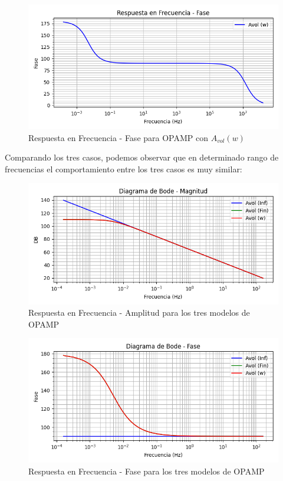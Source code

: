 \begin{figure}[H]
    \centering 
    \includegraphics [scale=1] {../Ejercicio3-CircuitoIntegradoresyDerivadores/Imagenes/teorico-avol-w-integrador-fase.png} 
    \caption{Respuesta en Frecuencia - Fase para OPAMP con $A_{vol}(w)$ }
    \label{fig:emptyPlotTool}
\end{figure}

Comparando los tres casos, podemos observar que en determinado rango de frecuencias el comportamiento entre los tres casos es muy similar:


\begin{figure}[H]
    \centering 
    \includegraphics [scale=1] {../Ejercicio3-CircuitoIntegradoresyDerivadores/Imagenes/comparativo-magnitud.png} 
    \caption{Respuesta en Frecuencia - Amplitud para los tres modelos de OPAMP }
    \label{fig:emptyPlotTool}
\end{figure}

\begin{figure}[H]
    \centering 
    \includegraphics [scale=1] {../Ejercicio3-CircuitoIntegradoresyDerivadores/Imagenes/comparativo-fase.png} 
    \caption{Respuesta en Frecuencia - Fase para los tres modelos de OPAMP }
    \label{fig:emptyPlotTool}
\end{figure}

